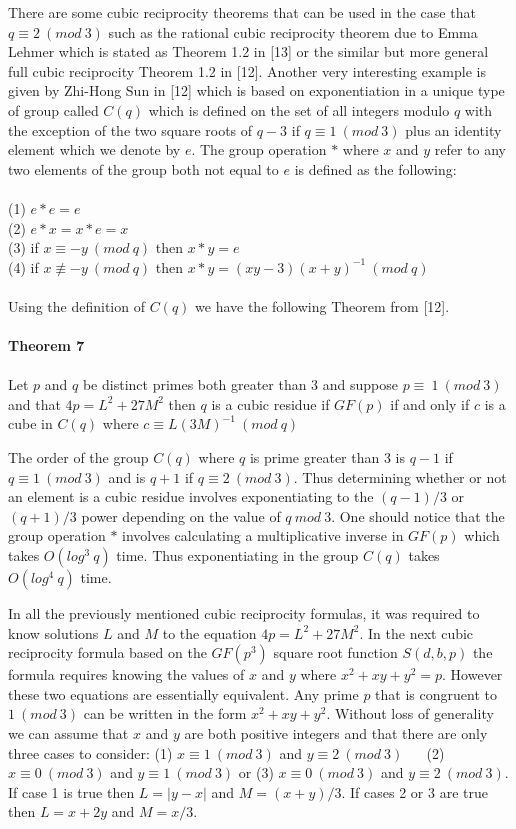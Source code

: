 \documentclass[final,letterpaper,oneside,10pt]{article}
\begin{document}
There are some cubic reciprocity theorems that can be used in the case that $q \equiv 2~(mod~3)$ such as the rational cubic reciprocity theorem due to Emma Lehmer which is stated as Theorem 1.2 in [13] or the similar but more general full cubic reciprocity Theorem 1.2 in [12].  Another very interesting example is given by Zhi-Hong Sun in [12] which is based on
exponentiation in a unique type of group called $C(q)$ which is  defined on the set of all integers modulo $q$ with the exception of the two square roots of $q-3$ if $q \equiv 1~(mod~3)$ plus an identity element which we denote by $e$.  The group operation $*$ where $x$ and $y$ refer to any two elements of the group both not equal to $e$ is defined as the following:
\\
\\
(1) $e*e = e$
\\
(2) $e*x = x*e = x$
\\
(3) if $x \equiv -y~(mod~q)$ then $x*y = e$
\\
(4) if $x \not\equiv -y~ (mod~q)$ then $x*y = (xy-3)(x+y)^{-1}~(mod~q)$
\\
\\
Using the definition of $C(q)$ we have the following Theorem from [12]. 
\\
\\
\textbf{Theorem 7}
\\
\\
Let $p$ and $q$ be distinct primes both greater than 3 and suppose $p \equiv ~1~(mod~3)$ and that $4p = L^{2}+ 27M^{2}$ then
$q$ is a cubic residue if $GF(p)$ if and only if
$c$ is a cube in $C(q)$ where $c \equiv L(3M)^{-1}~ (mod~q)$ 

The order of the group $C(q)$ where $q$ is prime greater than $3$ is $q-1$ if $q \equiv 1~(mod~3)$ and is $q+1$ if $q \equiv 2~(mod~3)$.  Thus determining whether or not an element is a cubic residue involves exponentiating to the $(q-1)/3$ or $(q+1)/3$ power depending on the value of $q ~mod~3$.  One should notice that the group operation $*$ involves calculating a multiplicative inverse in $GF(p)$ which takes $O(log^{3}~q)$ time.  Thus exponentiating in the group $C(q)$ takes $O(log^{4}~q)$ time.

In all the previously  mentioned cubic reciprocity formulas, it was required to know solutions $L$ and $M$ to the equation $4p = L^{2}+27M^{2}$.  In the next cubic reciprocity formula based on the $GF(p^{3})$ square root function $S(d,b,p)$ the formula requires knowing the values of $x$ and $y$ where $x^{2}+xy+y^{2} = p$.  However these two equations are essentially equivalent.  Any prime $p$ that is congruent to $1~(mod~3)$ can be written in the form  $x^{2}+xy+y^{2}$.  Without loss of generality we can assume that $x$ and $y$ are both positive integers and that there are only three cases to consider: (1) $x \equiv 1~(mod~3)$ and $y \equiv 2~(mod~3)$ ~~ (2) $x \equiv 0~(mod~3)$ and $y \equiv 1~(mod~3)$ or (3) $x \equiv 0~(mod~3)$ and $y \equiv 2~(mod~3)$.  If case 1 is true then $L = |y-x|$ and $M = (x+y)/3$.  If cases 2 or 3 are true then $L = x+2y$ and $M = x/3$.
\end{document}
